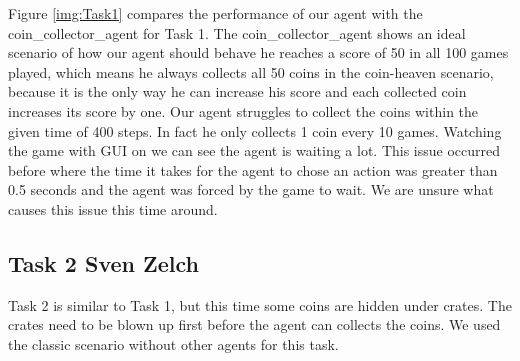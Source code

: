\documentclass[
	letterpaper, %
	12pt, %
]{CSUniSchoolLabReport}
\begin{document}
Figure \ref{img:Task1} compares the performance of our agent with the coin\_collector\_agent for Task 1.
The coin\_collector\_agent shows an ideal scenario of how our agent should behave he reaches a score of 50 in all 100 games played, which means he always collects all 50 coins in the coin-heaven scenario, because it is the only way he can increase his score and each collected coin increases its score by one. 
Our agent struggles to collect the coins within the given time of 400 steps.
In fact he only collects 1 coin every 10 games.
Watching the game with GUI on we can see the agent is waiting a lot.
This issue occurred before where the time it takes for the agent to chose an action was greater than 0.5 seconds and the agent was forced by the game to wait.
We are unsure what causes this issue this time around.

\subsection{Task 2 \tiny Sven Zelch}

Task 2 is similar to Task 1, but this time some coins are hidden under crates. The crates need to be blown up first before the agent can collects the coins. We used the classic scenario without other agents for this task.
\end{document}
